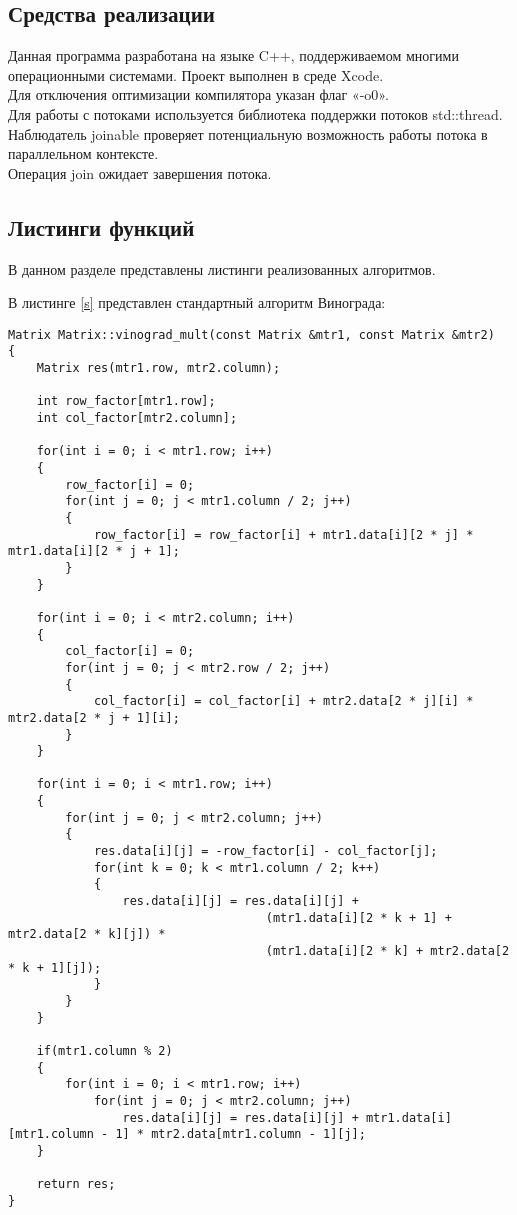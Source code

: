 \documentclass[a4paper, 14pt]{article}
\begin{document}
	\subsection{Средства реализации}
	
		Данная программа разработана на языке C++, поддерживаемом многими операционными системами. Проект выполнен в среде Xcode. \\
		
		Для отключения оптимизации компилятора указан флаг «-o0».\\
		
		Для работы с потоками используется библиотека поддержки потоков std::thread. \\
Наблюдатель joinable  проверяет потенциальную возможность работы потока в параллельном контексте.\\
Операция join ожидает завершения потока.
	
\newpage
\subsection{Листинги функций}

В данном разделе представлены листинги реализованных алгоритмов.

	В листинге \ref{s} представлен стандартный алгоритм Винограда:

	\begin{lstlisting}[label=s,caption=Стандартный алгоритм Винограда]
Matrix Matrix::vinograd_mult(const Matrix &mtr1, const Matrix &mtr2)
{
    Matrix res(mtr1.row, mtr2.column);

    int row_factor[mtr1.row];
    int col_factor[mtr2.column];

    for(int i = 0; i < mtr1.row; i++)
    {
        row_factor[i] = 0;
        for(int j = 0; j < mtr1.column / 2; j++)
        {
            row_factor[i] = row_factor[i] + mtr1.data[i][2 * j] * mtr1.data[i][2 * j + 1];
        }
    }

    for(int i = 0; i < mtr2.column; i++)
    {
        col_factor[i] = 0;
        for(int j = 0; j < mtr2.row / 2; j++)
        {
            col_factor[i] = col_factor[i] + mtr2.data[2 * j][i] * mtr2.data[2 * j + 1][i];
        }
    }

    for(int i = 0; i < mtr1.row; i++)
    {
        for(int j = 0; j < mtr2.column; j++)
        {
            res.data[i][j] = -row_factor[i] - col_factor[j];
            for(int k = 0; k < mtr1.column / 2; k++)
            {
                res.data[i][j] = res.data[i][j] +
                                    (mtr1.data[i][2 * k + 1] + mtr2.data[2 * k][j]) *
                                    (mtr1.data[i][2 * k] + mtr2.data[2 * k + 1][j]);
            }
        }
    }
    
    if(mtr1.column % 2)
    {
        for(int i = 0; i < mtr1.row; i++)
            for(int j = 0; j < mtr2.column; j++)
                res.data[i][j] = res.data[i][j] + mtr1.data[i][mtr1.column - 1] * mtr2.data[mtr1.column - 1][j];
    }

    return res;
}
\end{lstlisting}
\end{document}
